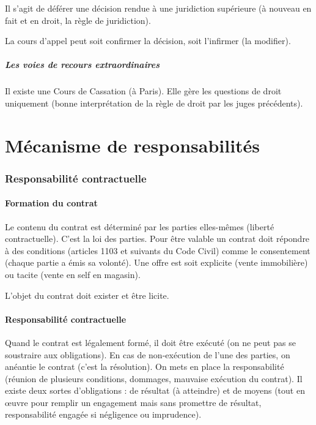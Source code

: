 \documentclass[10pt,a4paper]{article}
\begin{document}
Il s'agit de déférer une décision rendue à une juridiction supérieure (à nouveau en fait et en droit, la règle de juridiction).

La cours d'appel peut soit confirmer la décision, soit l'infirmer (la modifier).

\subsubsection{Les voies de recours extraordinaires}

Il existe une Cours de Cassation (à Paris). Elle gère les questions de droit uniquement (bonne interprétation de la règle de droit par les juges précédents).

\part{Mécanisme de responsabilités}

\section{Responsabilité contractuelle}

\subsection{Formation du contrat}

Le contenu du contrat est déterminé par les parties elles-mêmes (liberté contractuelle). C'est la loi des parties. Pour être valable un contrat doit répondre à des conditions (articles 1103 et suivants du Code Civil) comme le consentement (chaque partie a émis sa volonté). Une offre est soit explicite (vente immobilière) ou tacite (vente en self en magasin).

L'objet du contrat doit exister et être licite.

\subsection{Responsabilité contractuelle}

Quand le contrat est légalement formé, il doit être exécuté (on ne peut pas se soustraire aux obligations). En cas de non-exécution de l'une des parties, on anéantie le contrat (c'est la résolution). On mets en place la responsabilité (réunion de plusieurs conditions, dommages, mauvaise exécution du contrat). Il existe deux sortes d'obligations : de résultat (à atteindre) et de moyens (tout en œuvre pour remplir un engagement mais sans promettre de résultat, responsabilité engagée si négligence ou imprudence).
\end{document}
